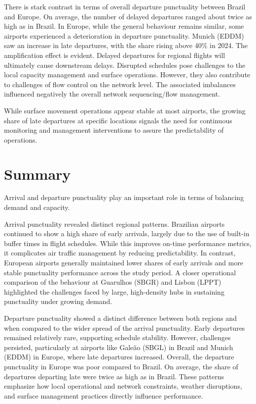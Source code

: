 \documentclass[
  a4paper,
  DIV=11,
  numbers=noendperiod]{scrreport}
\begin{document}
There is stark contrast in terms of overall departure punctuality
between Brazil and Europe. On average, the number of delayed departures
ranged about twice as high as in Brazil. In Europe, while the general
behaviour remains similar, some airports experienced a deterioration in
departure punctuality. Munich (EDDM) saw an increase in late departures,
with the share rising above 40\% in 2024. The amplification effect is
evident. Delayed departures for regional flights will ultimately cause
downstream delays. Disrupted schedules pose challenges to the local
capacity management and surface operations. However, they also
contribute to challenges of flow control on the network level. The
associated imbalances influenced negatively the overall network
sequencing/flow management.

While surface movement operations appear stable at most airports, the
growing share of late departures at specific locations signals the need
for continuous monitoring and management interventions to assure the
predictability of operations.

\section{Summary}\label{summary-2}

Arrival and departure punctuality play an important role in terms of
balancing demand and capacity.

Arrival punctuality revealed distinct regional patterns. Brazilian
airports continued to show a high share of early arrivals, largely due
to the use of built-in buffer times in flight schedules. While this
improves on-time performance metrics, it complicates air traffic
management by reducing predictability. In contrast, European airports
generally maintained lower shares of early arrivals and more stable
punctuality performance across the study period. A closer operational
comparison of the behaviour at Guarulhos (SBGR) and Lisbon (LPPT)
highlighted the challenges faced by large, high-density hubs in
sustaining punctuality under growing demand.

Departure punctuality showed a distinct difference between both regions
and when compared to the wider spread of the arrival punctuality. Early
departures remained relatively rare, supporting schedule stability.
However, challenges persisted, particularly at airports like Galeão
(SBGL) in Brazil and Munich (EDDM) in Europe, where late departures
increased. Overall, the departure punctuality in Europe was poor
compared to Brazil. On average, the share of departures departing late
were twice as high as in Brazil. These patterns emphasize how local
operational and network constraints, weather disruptions, and surface
management practices directly influence performance.
\end{document}
